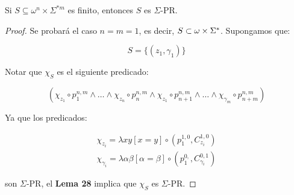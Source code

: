   \begin{corollary}
    \par Si $S \subseteq \omega^{n} \times \Sigma^{\ast m}$ es finito, entonces $S$ es $\Sigma$-PR.
  \end{corollary}
  \begin{proof}
    \par Se probará el caso $n = m = 1$, es decir, $S \subset \omega \times \Sigma^{\ast}$. Supongamos que:

    \[
      S = \{(z_{1}, \gamma_{1})\}
    \]

    \par Notar que $\chi_{S}$ es el siguiente predicado:

    \[
      \left(\chi_{z_{1}} \circ p_{1}^{n,m} \wedge \dotsc \wedge \chi_{z_{n}} \circ p_{n}^{n, m} \wedge \chi_{z_{1}}
      \circ p_{n+1}^{n,m} \wedge \dotsc \wedge \chi_{\gamma_{m}} \circ p_{n+m}^{n,m}\right)
    \]

    \par Ya que los predicados:

    \begin{eqnarray}
      \nonumber \chi_{z_{i}} = \lambda xy \left[x = y\right] \circ \left(p_{1}^{1,0}, C_{z_{i}}^{1, 0}\right) \\
      \nonumber \chi_{\gamma_{i}} = \lambda \alpha\beta \left[\alpha = \beta\right] \circ \left(p_{1}^{0, },
      C_{\gamma_{i}}^{0,1}\right)
    \end{eqnarray}

    \par son $\Sigma$-PR, el \textbf{Lema 28} implica que $\chi_{S}$ es $\Sigma$-PR.
  \end{proof}

